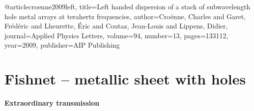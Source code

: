@article{croenne2009left,
  title={Left handed dispersion of a stack of subwavelength hole metal arrays at terahertz frequencies},
  author={Cro{\"e}nne, Charles and Garet, Fr{\'e}d{\'e}ric and Lheurette, {\'E}ric and Coutaz, Jean-Louis and Lippens, Didier},
  journal={Applied Physics Letters},
  volume={94},
  number={13},
  pages={133112},
  year={2009},
  publisher={AIP Publishing}
}

%
%
%
%
%
%
%
%
%
%
%
%
%
%
%


\FloatBarrier %
\section{Fishnet -- metallic sheet with holes} \label{section_fishnet}
\paragraph{Extraordinary transmission}
